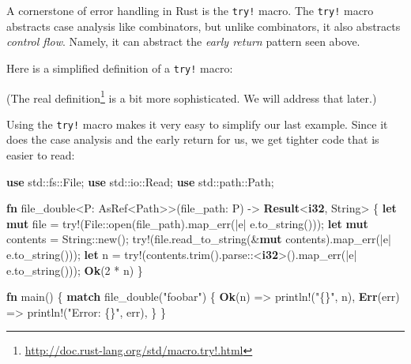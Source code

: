 \documentclass[a4paper,]{book}
\newenvironment{Shaded}{\begin{snugshade}}{\end{snugshade}}
\newcommand{\KeywordTok}[1]{\textcolor[rgb]{0.13,0.29,0.53}{\textbf{{#1}}}}
\newcommand{\DecValTok}[1]{\textcolor[rgb]{0.00,0.00,0.81}{{#1}}}
\newcommand{\StringTok}[1]{\textcolor[rgb]{0.31,0.60,0.02}{{#1}}}
\newcommand{\OtherTok}[1]{\textcolor[rgb]{0.56,0.35,0.01}{{#1}}}
\newcommand{\NormalTok}[1]{{#1}}
\renewcommand{\href}[2]{#2\footnote{\url{#1}}}
\begin{document}

A cornerstone of error handling in Rust is the \texttt{try!} macro. The
\texttt{try!} macro abstracts case analysis like combinators, but unlike
combinators, it also abstracts \emph{control flow}. Namely, it can
abstract the \emph{early return} pattern seen above.

Here is a simplified definition of a \texttt{try!} macro:


\begin{Shaded}
\end{Shaded}

(The \href{http://doc.rust-lang.org/std/macro.try!.html}{real
definition} is a bit more sophisticated. We will address that later.)

Using the \texttt{try!} macro makes it very easy to simplify our last
example. Since it does the case analysis and the early return for us, we
get tighter code that is easier to read:

\begin{Shaded}
\begin{Highlighting}[]
\KeywordTok{use} \NormalTok{std::fs::File;}
\KeywordTok{use} \NormalTok{std::io::Read;}
\KeywordTok{use} \NormalTok{std::path::Path;}

\KeywordTok{fn} \NormalTok{file_double<P: AsRef<Path>>(file_path: P) -> }\KeywordTok{Result}\NormalTok{<}\KeywordTok{i32}\NormalTok{, String> \{}
    \KeywordTok{let} \KeywordTok{mut} \NormalTok{file = }\OtherTok{try!}\NormalTok{(File::open(file_path).map_err(|e| e.to_string()));}
    \KeywordTok{let} \KeywordTok{mut} \NormalTok{contents = String::new();}
    \OtherTok{try!}\NormalTok{(file.read_to_string(&}\KeywordTok{mut} \NormalTok{contents).map_err(|e| e.to_string()));}
    \KeywordTok{let} \NormalTok{n = }\OtherTok{try!}\NormalTok{(contents.trim().parse::<}\KeywordTok{i32}\NormalTok{>().map_err(|e| e.to_string()));}
    \KeywordTok{Ok}\NormalTok{(}\DecValTok{2} \NormalTok{* n)}
\NormalTok{\}}

\KeywordTok{fn} \NormalTok{main() \{}
    \KeywordTok{match} \NormalTok{file_double(}\StringTok{"foobar"}\NormalTok{) \{}
        \KeywordTok{Ok}\NormalTok{(n) => }\OtherTok{println!}\NormalTok{(}\StringTok{"\{\}"}\NormalTok{, n),}
        \KeywordTok{Err}\NormalTok{(err) => }\OtherTok{println!}\NormalTok{(}\StringTok{"Error: \{\}"}\NormalTok{, err),}
    \NormalTok{\}}
\NormalTok{\}}
\end{Highlighting}
\end{Shaded}
\end{document}
